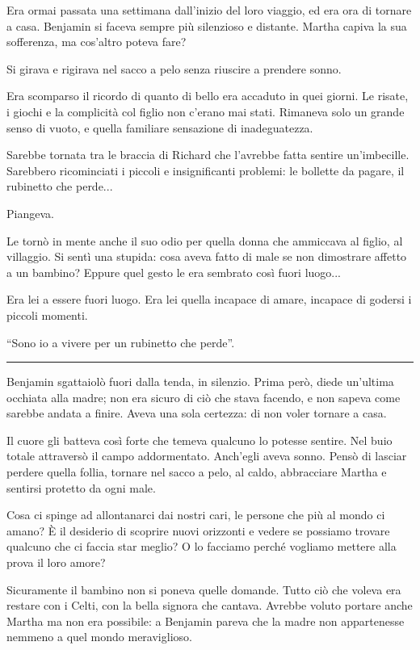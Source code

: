 \documentclass[a4paper,11pt,oneside,openright,final]{memoir}
\begin{document}
Era ormai passata una settimana dall'inizio del loro viaggio, ed era ora di
tornare a casa. Benjamin si faceva sempre più silenzioso e distante. Martha
capiva la sua sofferenza, ma cos'altro poteva fare?

Si girava e rigirava nel sacco a pelo senza riuscire a prendere sonno.

Era scomparso il ricordo di quanto di bello era accaduto in quei giorni. Le
risate, i giochi e la complicità col figlio non c'erano mai stati. Rimaneva
solo un grande senso di vuoto, e quella familiare sensazione di inadeguatezza.

Sarebbe tornata tra le braccia di Richard che l'avrebbe fatta sentire
un'imbecille. Sarebbero ricominciati i piccoli e insignificanti problemi: le
bollette da pagare, il rubinetto che perde...

Piangeva.

Le tornò in mente anche il suo odio per quella donna che ammiccava al figlio,
al villaggio. Si sentì una stupida: cosa aveva fatto di male se non dimostrare
affetto a un bambino? Eppure quel gesto le era sembrato così fuori luogo...

Era lei a essere fuori luogo. Era lei quella incapace di amare, incapace di
godersi i piccoli momenti.

``Sono io a vivere per un rubinetto che perde''.
\plainbreak{1}

Benjamin sgattaiolò fuori dalla tenda, in silenzio. Prima però, diede
un'ultima occhiata alla madre; non era sicuro di ciò che stava facendo, e non
sapeva come sarebbe andata a finire. Aveva una sola certezza: di non voler
tornare a casa.

Il cuore gli batteva così forte che temeva qualcuno lo potesse sentire. Nel
buio totale attraversò il campo addormentato. Anch'egli aveva sonno. Pensò di
lasciar perdere quella follia, tornare nel sacco a pelo, al caldo, abbracciare
Martha e sentirsi protetto da ogni male.

Cosa ci spinge ad allontanarci dai nostri cari, le persone che più al mondo ci
amano? È il desiderio di scoprire nuovi orizzonti e vedere se possiamo trovare
qualcuno che ci faccia star meglio? O lo facciamo perché vogliamo mettere alla
prova il loro amore?

Sicuramente il bambino non si poneva quelle domande. Tutto ciò che voleva era
restare con i Celti, con la bella signora che cantava. Avrebbe voluto portare
anche Martha ma non era possibile: a Benjamin pareva che la madre non
appartenesse nemmeno a quel mondo meraviglioso.
\end{document}
